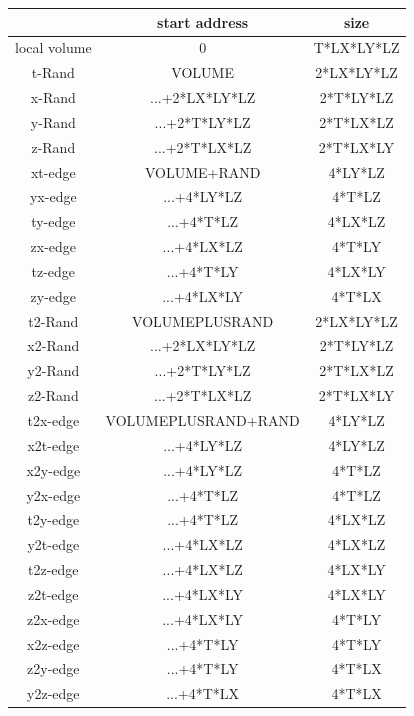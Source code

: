 \begin{table}[t]
  \centering
  \begin{tabular*}{1.\textwidth}{@{\extracolsep{\fill}}ccc}
    \hline\hline
     & start address & size \\
    \hline\hline
    local volume & 0 & T*LX*LY*LZ \\
    \hline\hline
    t-Rand       & VOLUME & 2*LX*LY*LZ \\
    x-Rand       & ...+2*LX*LY*LZ & 2*T*LY*LZ\\
    y-Rand       & ...+2*T*LY*LZ & 2*T*LX*LZ \\
    z-Rand       & ...+2*T*LX*LZ & 2*T*LX*LY  \\
    \hline\hline
    xt-edge      & VOLUME+RAND  & 4*LY*LZ \\
    yx-edge      & ...+4*LY*LZ  & 4*T*LZ \\
    ty-edge      & ...+4*T*LZ   & 4*LX*LZ \\
    zx-edge      & ...+4*LX*LZ  & 4*T*LY\\
    tz-edge      & ...+4*T*LY   & 4*LX*LY\\
    zy-edge      & ...+4*LX*LY  & 4*T*LX\\
    \hline\hline
    t2-Rand      & VOLUMEPLUSRAND & 2*LX*LY*LZ \\
    x2-Rand      & ...+2*LX*LY*LZ & 2*T*LY*LZ \\
    y2-Rand      & ...+2*T*LY*LZ  & 2*T*LX*LZ \\
    z2-Rand      & ...+2*T*LX*LZ  & 2*T*LX*LY \\
    \hline\hline
    t2x-edge     & VOLUMEPLUSRAND+RAND & 4*LY*LZ \\
    x2t-edge     & ...+4*LY*LZ         & 4*LY*LZ \\
    x2y-edge     & ...+4*LY*LZ         & 4*T*LZ \\
    y2x-edge     & ...+4*T*LZ          & 4*T*LZ \\
    t2y-edge     & ...+4*T*LZ          & 4*LX*LZ \\
    y2t-edge     & ...+4*LX*LZ         & 4*LX*LZ \\
    t2z-edge     & ...+4*LX*LZ         & 4*LX*LY \\
    z2t-edge     & ...+4*LX*LY         & 4*LX*LY \\
    z2x-edge     & ...+4*LX*LY         & 4*T*LY \\
    x2z-edge     & ...+4*T*LY          & 4*T*LY \\
    z2y-edge     & ...+4*T*LY          & 4*T*LX \\
    y2z-edge     & ...+4*T*LX          & 4*T*LX \\
    \hline\hline
 \end{tabular*}
\end{table}

